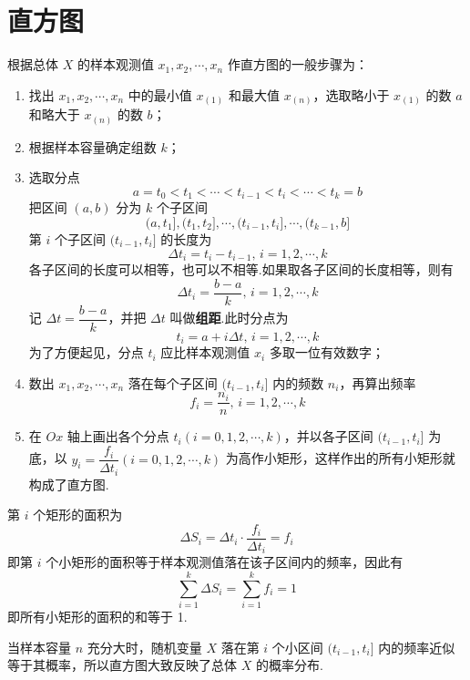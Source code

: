 \section{直方图}

根据总体 $X$ 的样本观测值 $x_1,x_2,\cdots,x_n$ 作直方图的一般步骤为：

\begin{enumerate}
    \item 找出 $x_1,x_2,\cdots,x_n$ 中的最小值 $x_{(1)}$ 和最大值 $x_{(n)}$，选取略小于 $x_{(1)}$ 的数 $a$ 和略大于 $x_{(n)}$ 的数 $b$；

    \item 根据样本容量确定组数 $k$；

    \item 选取分点
    $$
    a = t_0 < t_1 < \cdots < t_{i-1} < t_i < \cdots < t_k = b
    $$
    把区间 $(a,b)$ 分为 $k$ 个子区间
    $$
    (a, t_1], (t_1, t_2], \cdots, (t_{i-1}, t_i], \cdots, (t_{k-1}, b]
    $$
    第 $i$ 个子区间 $(t_{i-1}, t_i]$ 的长度为
    $$
    \Delta t_i = t_i - t_{i-1}, \, i=1,2,\cdots,k
    $$
    各子区间的长度可以相等，也可以不相等.如果取各子区间的长度相等，则有
    $$
    \Delta t_i = \dfrac{b-a}{k}, \, i=1,2,\cdots,k
    $$
    记 $\Delta t = \dfrac{b-a}{k}$，并把 $\Delta t$ 叫做\textbf{组距}.此时分点为
    $$
    t_i = a + i \Delta t, \, i=1,2,\cdots,k
    $$
    为了方便起见，分点 $t_i$ 应比样本观测值 $x_i$ 多取一位有效数字；

    \item 数出 $x_1,x_2,\cdots,x_n$ 落在每个子区间 $(t_{i-1}, t_i]$ 内的频数 $n_i$，再算出频率
    $$
    f_i = \dfrac{n_i}{n}, \, i=1,2,\cdots,k
    $$

    \item 在 $Ox$ 轴上画出各个分点 $t_i(i=0,1,2,\cdots,k)$，并以各子区间 $(t_{i-1}, t_i]$ 为底，以 $y_i = \dfrac{f_i}{\Delta t_i} (i=0,1,2,\cdots,k)$ 为高作小矩形，这样作出的所有小矩形就构成了直方图.
\end{enumerate}

\vspace{0.5em}

第 $i$ 个矩形的面积为
$$
\Delta S_i = \Delta t_i \cdot \dfrac{f_i}{\Delta t_i} = f_i
$$
即第 $i$ 个小矩形的面积等于样本观测值落在该子区间内的频率，因此有
$$
\sum_{i=1}^k \Delta S_i = \sum_{i=1}^k f_i = 1
$$
即所有小矩形的面积的和等于 1.

当样本容量 $n$ 充分大时，随机变量 $X$ 落在第 $i$ 个小区间 $(t_{i-1}, t_i]$ 内的频率近似等于其概率，所以直方图大致反映了总体 $X$ 的概率分布.

